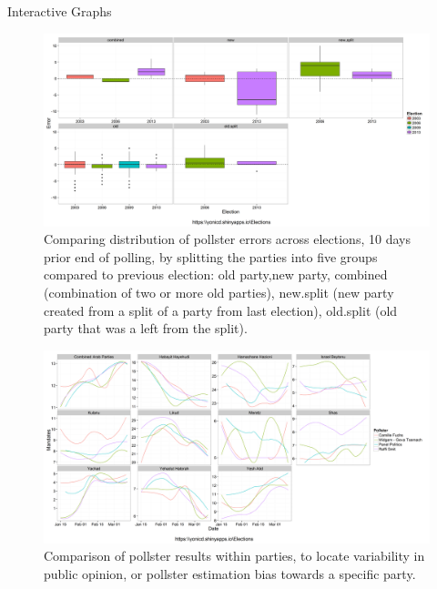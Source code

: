 \documentclass[final, hyperref={pdfpagelabels=false}]{beamer}
\begin{document}
\begin{frame}{}
\begin{columns}[t]
\begin{column}{.45\linewidth}
\begin{block}{Interactive Graphs}
				\begin{figure}[h]
					\centering
					\includegraphics[width=.75\linewidth]{../www/ElectionPlot_longitudinal}
					\caption{Comparing distribution of pollster errors across elections, 10 days prior end of polling, by splitting the parties into five groups compared to previous election: old party,new party, combined (combination of two or more old parties), new.split (new party created from a split of a party from last election), old.split (old party that was a left from the split).}
					\label{fig:ElectionPlot_longitudinal}
				\end{figure}	
				\begin{figure}[h]
					\centering
					\includegraphics[width=.75\linewidth]{../www/ElectionPlot_trend}
					\caption{Comparison of pollster results within parties, to locate variability in public opinion, or pollster estimation bias towards a specific party.}
					\label{fig:ElectionPlot_trend}
				\end{figure}	
			\end{block}
		\end{column}
		
	\end{columns}
\end{frame}
\end{document}
